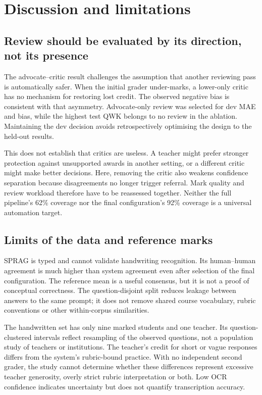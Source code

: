 \section{Discussion and limitations}
\subsection{Review should be evaluated by its direction, not its presence}
The advocate--critic result challenges the assumption that another reviewing pass is automatically safer. When the initial grader under-marks, a lower-only critic has no mechanism for restoring lost credit. The observed negative bias is consistent with that asymmetry. Advocate-only review was selected for dev MAE and bias, while the highest test QWK belongs to no review in the ablation. Maintaining the dev decision avoids retrospectively optimising the design to the held-out results.

This does not establish that critics are useless. A teacher might prefer stronger protection against unsupported awards in another setting, or a different critic might make better decisions. Here, removing the critic also weakens confidence separation because disagreements no longer trigger referral. Mark quality and review workload therefore have to be reassessed together. Neither the full pipeline's 62\% coverage nor the final configuration's 92\% coverage is a universal automation target.

\subsection{Limits of the data and reference marks}
SPRAG is typed and cannot validate handwriting recognition. Its human--human agreement is much higher than system agreement even after selection of the final configuration. The reference mean is a useful consensus, but it is not a proof of conceptual correctness. The question-disjoint split reduces leakage between answers to the same prompt; it does not remove shared course vocabulary, rubric conventions or other within-corpus similarities.

The handwritten set has only nine marked students and one teacher. Its question-clustered intervals reflect resampling of the observed questions, not a population study of teachers or institutions. The teacher's credit for short or vague responses differs from the system's rubric-bound practice. With no independent second grader, the study cannot determine whether these differences represent excessive teacher generosity, overly strict rubric interpretation or both. Low OCR confidence indicates uncertainty but does not quantify transcription accuracy.

